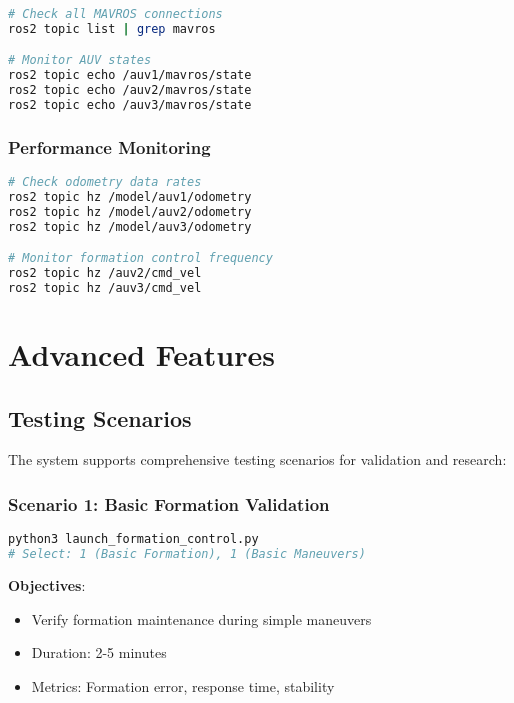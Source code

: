 \documentclass[11pt,a4paper]{article}
\begin{document}
\begin{lstlisting}[language=bash, caption=MAVROS System Monitoring]
# Check all MAVROS connections
ros2 topic list | grep mavros

# Monitor AUV states
ros2 topic echo /auv1/mavros/state
ros2 topic echo /auv2/mavros/state
ros2 topic echo /auv3/mavros/state
\end{lstlisting}

\subsubsection{Performance Monitoring}

\begin{lstlisting}[language=bash, caption=System Performance Monitoring]
# Check odometry data rates
ros2 topic hz /model/auv1/odometry
ros2 topic hz /model/auv2/odometry
ros2 topic hz /model/auv3/odometry

# Monitor formation control frequency
ros2 topic hz /auv2/cmd_vel
ros2 topic hz /auv3/cmd_vel
\end{lstlisting}

\section{Advanced Features}

\subsection{Testing Scenarios}

The system supports comprehensive testing scenarios for validation and research:

\subsubsection{Scenario 1: Basic Formation Validation}

\begin{lstlisting}[language=bash, caption=Basic Formation Testing]
python3 launch_formation_control.py
# Select: 1 (Basic Formation), 1 (Basic Maneuvers)
\end{lstlisting}

\textbf{Objectives}:
\begin{itemize}
    \item Verify formation maintenance during simple maneuvers
    \item Duration: 2-5 minutes
    \item Metrics: Formation error, response time, stability
\end{itemize}
\end{document}
